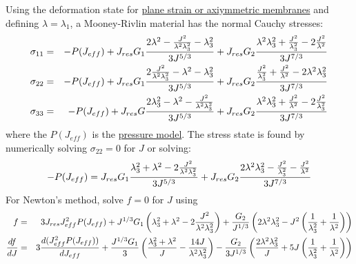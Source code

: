 \documentclass[11pt]{book}
\def\Jeff{J_{eff}}
\def\Jres{J_{res}}
\begin{document}
Using the deformation state for \hyperref[MMT]{plane strain or axiymmetric membranes} and defining $\lambda=\lambda_1$, a Mooney-Rivlin material has the normal Cauchy stresses:
\begin{eqnarray}
      \sigma_{11} & = & -P(\Jeff) + \Jres G_1{2\lambda^2-{J^2\over\lambda^2\lambda_3^2}-\lambda_3^2\over 3J^{5/3}} 
                                  + \Jres G_2{\lambda^2\lambda_3^2 + {J^2\over \lambda_3^2} -2{J^2\over\lambda^2}\over 3J^{7/3}} \\
      \sigma_{22} & = & -P(\Jeff) + \Jres G_1{2{J^2\over\lambda^2\lambda_3^2}-\lambda^2-\lambda_3^2\over 3J^{5/3}}
                                  + \Jres G_2{{J^2\over\lambda_3^2} + {J^2\over\lambda^2}-2\lambda^2\lambda_3^2\over 3J^{7/3}}  \\
      \sigma_{33} & = & -P(\Jeff) + \Jres G{2\lambda_3^2-\lambda^2-{J^2\over\lambda^2\lambda_3^2}\over 3J^{5/3}} 
                                  + \Jres G_2{\lambda^2\lambda_3^2 + {J^2\over\lambda^2}-2{J^2\over \lambda_3^2}\over 3J^{7/3}}
\end{eqnarray}
where the $P(\Jeff)$ is the \hyperref[PTerms]{pressure model}. The stress state is found by numerically solving $\sigma_{22}=0$ for $J$ or solving:
\begin{equation}
	-P(\Jeff) =  \Jres G_1{\lambda_3^2+\lambda^2-2{J^2\over\lambda^2\lambda_3^2}\over 3J^{5/3}} + 
	             \Jres G_2{2\lambda^2\lambda_3^2 - {J^2\over \lambda_3^2} - {J^2\over\lambda^2}\over 3J^{7/3}}
\end{equation}
For Newton's method, solve $f=0$ for $J$ using
\begin{eqnarray}
	f & = & 3 \Jres \Jeff^2 P(\Jeff) + J^{1/3} G_1\left(\lambda_3^2+\lambda^2-2{J^2\over\lambda^2\lambda_3^2}\right)
	                         + {G_2\over J^{1/3}}\left(2\lambda^2\lambda_3^2 - J^2\left({1\over \lambda_3^2}
	                         +{1\over\lambda^2}\right)\right)     \nonumber \\
	{df\over dJ} & = & 3 {d(\Jeff^2 P(\Jeff))\over d\Jeff} + {J^{1/3}G_1\over3}\left({\lambda_3^2+\lambda^2\over J}-{14J\over\lambda^2\lambda_3^2}\right)
	          - {G_2\over3J^{1/3}}\left({2\lambda^2\lambda_3^2\over J}+5J\left({1\over \lambda_3^2}+{1\over\lambda^2}\right)\right)
	          \nonumber \\
\end{eqnarray}
\end{document}
